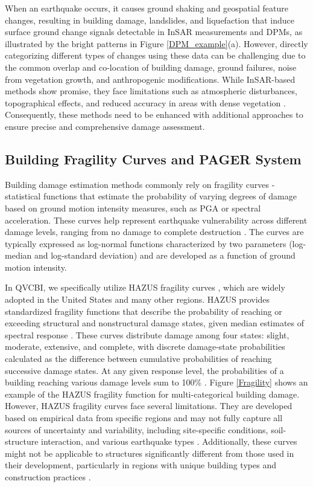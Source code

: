 \documentclass[review]{elsarticle}
\begin{document}
When an earthquake occurs, it causes ground shaking and geospatial feature changes, resulting in building damage, landslides, and liquefaction that induce surface ground change signals detectable in InSAR measurements and DPMs, as illustrated by the bright patterns in Figure \ref{DPM_example}(a). However, directly categorizing different types of changes using these data can be challenging due to the common overlap and co-location of building damage, ground failures, noise from vegetation growth, and anthropogenic modifications. While InSAR-based methods show promise, they face limitations such as atmospheric disturbances, topographical effects, and reduced accuracy in areas with dense vegetation \cite{havivi2018combining}. Consequently, these methods need to be enhanced with additional approaches to ensure precise and comprehensive damage assessment.




\subsection{Building Fragility Curves and PAGER System}

Building damage estimation methods commonly rely on fragility curves - statistical functions that estimate the probability of varying degrees of damage based on ground motion intensity measures, such as PGA or spectral acceleration. These curves help represent earthquake vulnerability across different damage levels, ranging from no damage to complete destruction \cite{bozorgnia2004earthquake, biglari2020damage}. The curves are typically expressed as log-normal functions characterized by two parameters (log-median and log-standard deviation) and are developed as a function of ground motion intensity.

In QVCBI, we specifically utilize HAZUS fragility curves \cite{fema2003hazus}, which are widely adopted in the United States and many other regions. HAZUS provides standardized fragility functions that describe the probability of reaching or exceeding structural and nonstructural damage states, given median estimates of spectral response \cite{kircher1997development}. These curves distribute damage among four states: slight, moderate, extensive, and complete, with discrete damage-state probabilities calculated as the difference between cumulative probabilities of reaching successive damage states. At any given response level, the probabilities of a building reaching various damage levels sum to 100\% \cite{fragility}. Figure \ref{Fragility} shows an example of the HAZUS fragility function for multi-categorical building damage. However, HAZUS fragility curves face several limitations. They are developed based on empirical data from specific regions and may not fully capture all sources of uncertainty and variability, including site-specific conditions, soil-structure interaction, and various earthquake types \cite{baker2011limitations}. Additionally, these curves might not be applicable to structures significantly different from those used in their development, particularly in regions with unique building types and construction practices \cite{bommer2009fragility}. 
\end{document}
